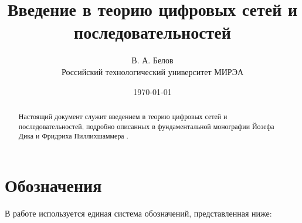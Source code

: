 \documentclass[12pt, a4paper]{article}
\title{Введение в теорию цифровых сетей и последовательностей}
\author{В. А. Белов \\ \small Российский технологический университет МИРЭА}
\date{\today}
\theoremstyle{plain}
\theoremstyle{definition}
\theoremstyle{remark}
\begin{document}
\maketitle

\begin{abstract}
Настоящий документ служит введением в теорию цифровых сетей и последовательностей, подробно описанных в фундаментальной монографии Йозефа Дика и Фридриха Пиллихшаммера \cite{dick2010digital}.
\end{abstract}

\section{Обозначения}

В работе используется единая система обозначений, представленная ниже:
\end{document}
